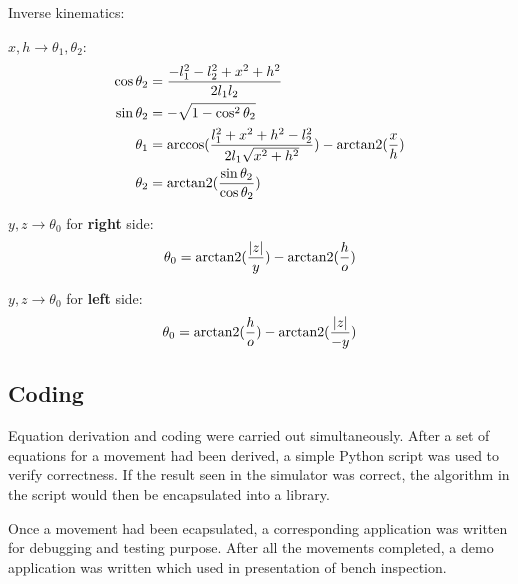 \noindent
Inverse kinematics:

$x, h \rightarrow \theta_1, \theta_2$:
\begin{align}
\cos\theta_2 &= \frac{-l_1^2 - l_2^2 + x^2 + h^2}{2 l_1 l_2} \\
\sin\theta_2 &= -\sqrt{1 - \cos^2\theta_2} \\
\theta_1 &= \arccos(\frac{l_1^2 + x^2 + h^2 - l_2^2}{2 l_1 \sqrt{x^2 + h^2}}) - \operatorname{arctan2}(\frac{x}{h}) \\
\theta_2 &= \operatorname{arctan2}(\frac{\sin\theta_2}{\cos\theta_2})
\end{align}

$y, z \rightarrow \theta_0$ for \textbf{right} side:
\begin{equation}
   \theta_0 = \operatorname{arctan2}(\frac{\lvert z \lvert}{y}) - \operatorname{arctan2}(\frac{h}{o})
\end{equation}

$y, z \rightarrow \theta_0$ for \textbf{left} side:
\begin{equation}
   \theta_0 = \operatorname{arctan2}(\frac{h}{o}) - \operatorname{arctan2}(\frac{\lvert z \lvert}{-y})
\end{equation}

\subsection{Coding}

Equation derivation and coding were carried out simultaneously. After a set of equations for a movement had been derived, a simple Python script was used to verify correctness. If the result seen in the simulator was correct, the algorithm in the script would then be encapsulated into a library.

Once a movement had been ecapsulated, a corresponding application was written for debugging and testing purpose. After all the movements completed, a demo application was written which used in presentation of bench inspection.

